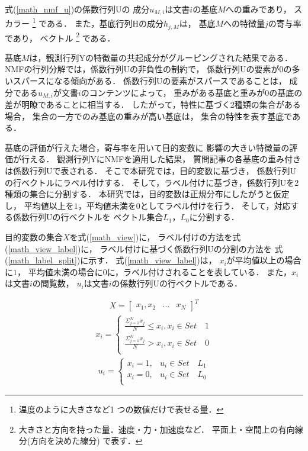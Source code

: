 \documentclass[12pt,a4paper,twocolumn,twoside]{jsik}
\begin{document}
式(\ref{math_nmf_u})の係数行列Uの
成分$u_{M,i}$は文書$i$の基底$M$への重みであり，
スカラー
\footnote{温度のように大きさなど1 つの数値だけで表せる量．}
である．
%
また，基底行列Hの成分$h_{j,M}$は，
基底$M$への特徴量$j$の寄与率であり，
ベクトル
\footnote{大きさと方向を持った量．速度・力・加速度など．
平面上・空間上の有向線分(方向を決めた線分) で表す．}
である．

基底$M$は，観測行列Yの特徴量の共起成分がグルーピングされた結果である．
%
NMFの行列分解では，係数行列Uの非負性の制約で，
係数行列Uの要素が0の多いスパースになる傾向がある\cite{nmf}．
%
係数行列Uの要素がスパースであることは，
成分である$u_{M,i}$が文書$i$のコンテンツによって，
重みがある基底と重みが0の基底の差が明瞭であることに相当する．
%
したがって，特性に基づく2種類の集合がある場合，
集合の一方でのみ基底の重みが高い基底は，
集合の特性を表す基底である．

\newpage
基底の評価が行えた場合，寄与率を用いて目的変数に
影響の大きい特徴量の評価が行える．
%
観測行列YにNMFを適用した結果，
質問記事の各基底の重み付きは係数行列Uで表される．
%
そこで本研究では，目的変数に基づき，
係数行列Uの行ベクトルにラベル付けする．
そして，ラベル付けに基づき，係数行列Uを2種類の集合に分割する．
%
本研究では，目的変数は正規分布にしたがうと仮定し，
平均値以上を$1$，平均値未満を$0$としてラベル付けを行う．
%
そして，対応する係数行列Uの行ベクトルを
ベクトル集合$L_{1}$，$L_{0}$に分割する．

目的変数の集合$X$を式(\ref{math_view})に，
ラベル付けの方法を式(\ref{math_view_label})に，
ラベル付けに基づく係数行列Uの分割の方法を
式(\ref{math_label_split})に示す．
式(\ref{math_view_label})は，
$x_{i}$が平均値以上の場合に$1$，
平均値未満の場合に$0$に，ラベル付けされることを表している．
%
また，$x_{i}$は文書$i$の閲覧数，
$u_{i}$は文書$i$の係数行列Uの行ベクトルである．

\begin{eqnarray}
\label{math_view}
X = \left[
    \begin{array}{rrr}
      x_{1},x_{2}&...&x_{N}
    \end{array}
  \right]^{T}
\end{eqnarray}
%
\begin{eqnarray}
\label{math_view_label}
x_{i} = 
\left\{
\begin{array}{ll}
\frac{ \Sigma_{j=1}^{N}x_{j}}{N}  \leq x_{i} , x_{i}  \in Set \quad 1 \\
\frac{ \Sigma_{j=1}^{N}x_{j}}{N} > x_{i} , x_{i}  \in Set \quad 0 \\
\end{array}
\right.
\end{eqnarray}
%
\begin{eqnarray}
\label{math_label_split}
u_{i} = 
\left\{
\begin{array}{ll}
x_{i} = 1 ,& u_{i}  \in  Set \quad L_{1} \\
x_{i} = 0 ,& u_{i}  \in  Set \quad L_{0} \\
\end{array}
\right.
\end{eqnarray}
\end{document}
